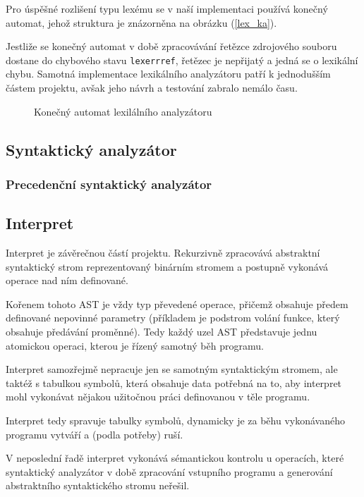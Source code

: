 \documentclass[12pt,a4paper,titlepage,final]{article}
\begin{document}
Pro úspěšné rozlišení typu lexému se v naší implementaci používá konečný
automat, jehož struktura je znázorněna na obrázku (\ref{lex_ka}).

Jestliže se konečný automat v době zpracovávání řetězce zdrojového souboru dostane do
chybového stavu \verb|lexerrref|, řetězec je nepřijatý a jedná se o lexikální
chybu. Samotná implementace lexikálního analyzátoru patří k jednodušším
částem projektu, avšak jeho návrh a testování zabralo nemálo času.

\begin{figure}
	\centering
		
	\caption{Konečný automat lexilálního analyzátoru}
\end{figure}

\subsection{Syntaktický analyzátor} \label{syntakticky_analyzator}
\subsubsection{Precedenční syntaktický analyzátor} \label{precedencni_syntakticky_analyzator}
\subsection{Interpret} \label{interpret}

Interpret je závěrečnou částí projektu. Rekurzivně zpracovává abstraktní
syntaktický strom reprezentovaný binárním stromem a postupně vykonává operace
nad ním definované.

Kořenem tohoto AST je vždy typ převedené operace, přičemž obsahuje předem
definované nepovinné parametry (příkladem je podstrom volání funkce, který
obsahuje předávání proměnné). Tedy každý uzel AST představuje jednu atomickou
operaci, kterou je řízený samotný běh programu.

Interpret samozřejmě nepracuje jen se samotným syntaktickým stromem, ale
taktéž s tabulkou symbolů, která obsahuje data potřebná na to, aby interpret
mohl vykonávat nějakou užitočnou práci definovanou v těle programu.

Interpret tedy spravuje tabulky symbolů, dynamicky je za běhu
vykonávaného programu vytváří a (podla potřeby) ruší.

V neposlední řadě interpret vykonává sémantickou kontrolu u operacích, které
syntaktický analyzátor v době zpracování vstupního programu a generování
abstraktního syntaktického stromu neřešil.
\end{document}
